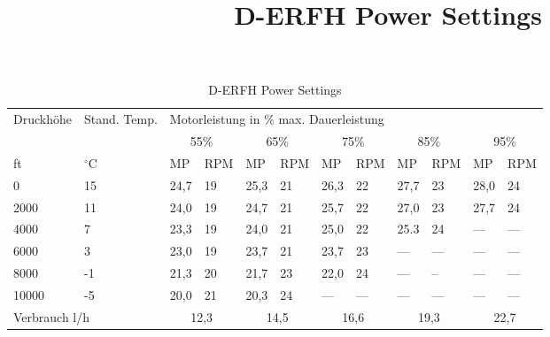 \documentclass[12pt]{article}
\begin{document}
\title{D-ERFH Power Settings}

\begin{table*}[t]
    \centering
    \caption{D-ERFH Power Settings}
    \begin{tabular}{@{}ll|ll|ll|ll|ll|ll@{}}
      \multirow{2}{*}{Druckhöhe} &
        \multirow{2}{*}{Stand. Temp.} &
        \multicolumn{10}{l}{Motorleistung in \% max. Dauerleistung} \\ \cmidrule(l){3-12} 
       &
         &
        \multicolumn{2}{c}{55\%} &
        \multicolumn{2}{c}{65\%} &
        \multicolumn{2}{c}{75\%} &
        \multicolumn{2}{c}{85\%} &
        \multicolumn{2}{c}{95\%} \\ \cmidrule(r){1-2}
      ft    & $^{\circ}$C & MP   & RPM & MP   & RPM & MP   & RPM & MP   & RPM & MP   & RPM \\
      0     & 15 & 24,7 & 19  & 25,3 & 21  & 26,3 & 22  & 27,7 & 23  & 28,0 & 24  \\\hline
      2000  & 11 & 24,0 & 19  & 24,7 & 21  & 25,7 & 22  & 27,0 & 23  & 27,7 & 24  \\\hline
      4000  & 7  & 23,3 & 19  & 24,0 & 21  & 25,0 & 22  & 25.3 & 24  & ---  & --- \\\hline
      6000  & 3  & 23,0 & 19  & 23,7 & 21  & 23,7 & 23  & ---  & --- & ---  & --- \\\hline
      8000  & -1 & 21,3 & 20  & 21,7 & 23  & 22,0 & 24  & ---  & --  & ---  & --- \\\hline
      10000 & -5 & 20,0 & 21  & 20,3 & 24  & ---  & --- & ---  & --- & ---  & --- \\\hline
      \multicolumn{2}{l}{Verbrauch l/h} &
        \multicolumn{2}{c}{12,3} &
        \multicolumn{2}{c}{14,5} &
        \multicolumn{2}{c}{16,6} &
        \multicolumn{2}{c}{19,3} &
        \multicolumn{2}{c}{22,7}
      \end{tabular}
  \end{table*}
\end{document}
